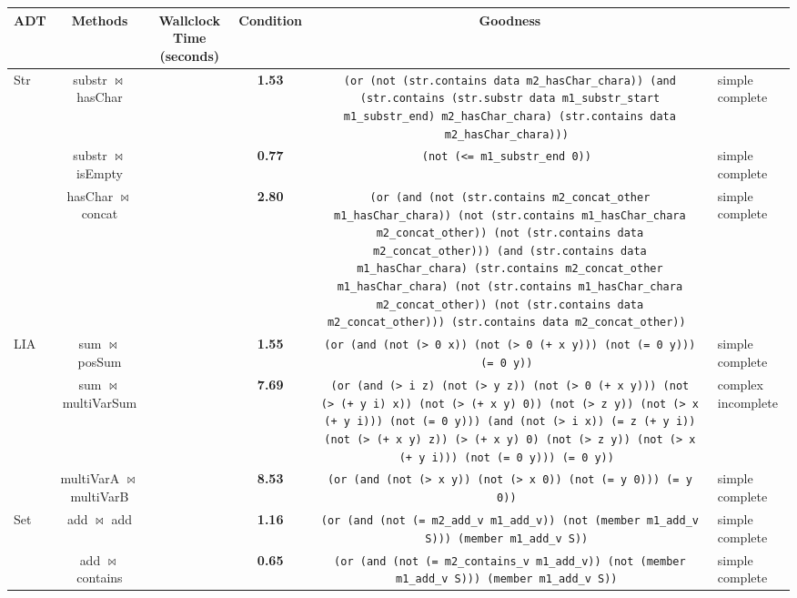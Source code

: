 \begin{table} \begin{center} \begin{tabular}{l|c|c|c|c} \toprule
\bf{ADT} & \bf{Methods} & Wallclock Time (seconds) & Condition & Goodness\\
\toprule
\hline
Str & substr $ \bowtie $ hasChar &  & \bf{1.53}& \texttt{(or (not (str.contains data m2\_hasChar\_chara)) (and (str.contains (str.substr data m1\_substr\_start m1\_substr\_end) m2\_hasChar\_chara) (str.contains data m2\_hasChar\_chara)))
} & simple complete\\
 & substr $ \bowtie $ isEmpty &  & \bf{0.77}& \texttt{(not (<= m1\_substr\_end 0))
} & simple complete\\
 & hasChar $ \bowtie $ concat &  & \bf{2.80}& \texttt{(or (and (not (str.contains m2\_concat\_other m1\_hasChar\_chara)) (not (str.contains m1\_hasChar\_chara m2\_concat\_other)) (not (str.contains data m2\_concat\_other))) (and (str.contains data m1\_hasChar\_chara) (str.contains m2\_concat\_other m1\_hasChar\_chara) (not (str.contains m1\_hasChar\_chara m2\_concat\_other)) (not (str.contains data m2\_concat\_other))) (str.contains data m2\_concat\_other))
} & simple complete\\
\hline
LIA & sum $ \bowtie $ posSum &  & \bf{1.55}& \texttt{(or (and (not (\textgreater\ 0 x)) (not (\textgreater\ 0 (+ x y))) (not (= 0 y))) (= 0 y))
} & simple complete\\
 & sum $ \bowtie $ multiVarSum &  & \bf{7.69}& \texttt{(or (and (\textgreater\ i z) (not (\textgreater\ y z)) (not (\textgreater\ 0 (+ x y))) (not (\textgreater\ (+ y i) x)) (not (\textgreater\ (+ x y) 0)) (not (\textgreater\ z y)) (not (\textgreater\ x (+ y i))) (not (= 0 y))) (and (not (\textgreater\ i x)) (= z (+ y i)) (not (\textgreater\ (+ x y) z)) (\textgreater\ (+ x y) 0) (not (\textgreater\ z y)) (not (\textgreater\ x (+ y i))) (not (= 0 y))) (= 0 y))
} & complex incomplete\\
 & multiVarA $ \bowtie $ multiVarB &  & \bf{8.53}& \texttt{(or (and (not (\textgreater\ x y)) (not (\textgreater\ x 0)) (not (= y 0))) (= y 0))
} & simple complete\\
\hline
Set & add $ \bowtie $ add &  & \bf{1.16}& \texttt{(or (and (not (= m2\_add\_v m1\_add\_v)) (not (member m1\_add\_v S))) (member m1\_add\_v S))
} & simple complete\\
 & add $ \bowtie $ contains &  & \bf{0.65}& \texttt{(or (and (not (= m2\_contains\_v m1\_add\_v)) (not (member m1\_add\_v S))) (member m1\_add\_v S))
} & simple complete\\

\end{tabular}
\end{center}
\end{table}
